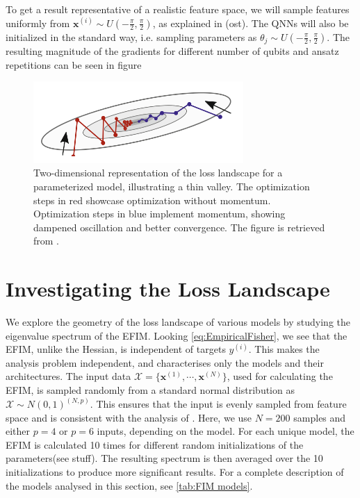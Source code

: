 To get a result representative of a realistic feature space, we will sample features uniformly from $\boldsymbol{x}^{(i)} \sim U(-\frac{\pi}{2}, \frac{\pi}{2})$, as explained in (ost). The QNNs will also be initialized in the standard way, i.e. sampling parameters as $\theta_j \sim U(-\frac{\pi}{2}, \frac{\pi}{2})$. The resulting magnitude of the gradients for different number of qubits and ansatz repetitions can be seen in figure 

\begin{figure}[htp]
    \centering
    \includegraphics[width=8cm]{latex/figures/thin_vally.png}
    \caption{Two-dimensional representation of the loss landscape for a parameterized model, illustrating a thin valley. The optimization steps in red showcase optimization without momentum. Optimization steps in blue implement momentum, showing dampened oscillation and better convergence. The figure is retrieved from \citet{SupervisedwquantumComputers}.}
    \label{fig:thinValley}
\end{figure}


\section{Investigating the Loss Landscape}\label{sec:Investigating the Loss Landscape}
We explore the geometry of the loss landscape of various models by studying the eigenvalue spectrum of the EFIM. Looking \autoref{eq:EmpiricalFisher}, we see that the EFIM, unlike the Hessian, is independent of targets $y^{(i)}$. This makes the analysis problem independent, and characterises only the models and their architectures. The input data $\mathcal{X} = \{\boldsymbol{x}^{(1)}, \cdots, \boldsymbol{x}^{(N)}\}$, used for calculating the EFIM, is sampled randomly from a standard normal distribution as $\mathcal{X} \sim N(0,1)^{(N,p)}$. This ensures that the input is evenly sampled from feature space and is consistent with the analysis of \citet{abbas2020power}.  Here, we use $N=200$ samples and either $p=4$ or $p=6$ inputs, depending on the model. For each unique model, the EFIM is calculated 10 times for different random initializations of the parameters(see stuff). The resulting spectrum is then averaged over the 10 initializations to produce more significant results. For a complete description of the models analysed in this section, see \autoref{tab:FIM models}.

